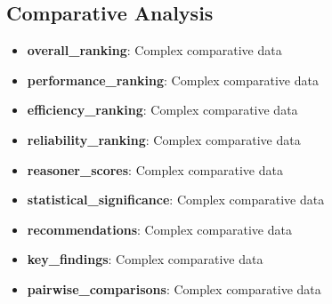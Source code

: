 \documentclass[11pt,a4paper]{{article}}
\begin{document}
\subsection{Comparative Analysis}
\begin{itemize}
    \item \textbf{overall_ranking}: Complex comparative data
    \item \textbf{performance_ranking}: Complex comparative data
    \item \textbf{efficiency_ranking}: Complex comparative data
    \item \textbf{reliability_ranking}: Complex comparative data
    \item \textbf{reasoner_scores}: Complex comparative data
    \item \textbf{statistical_significance}: Complex comparative data
    \item \textbf{recommendations}: Complex comparative data
    \item \textbf{key_findings}: Complex comparative data
    \item \textbf{pairwise_comparisons}: Complex comparative data
\end{itemize}
\end{document}
